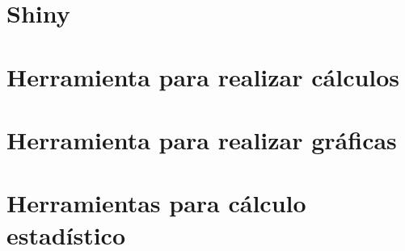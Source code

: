 \documentclass[
]{book}
\begin{document}
\section{Shiny}\label{shiny}

\section{Herramienta para realizar cálculos}\label{herramienta-para-realizar-cuxe1lculos}

\section{Herramienta para realizar gráficas}\label{herramienta-para-realizar-gruxe1ficas}

\section{Herramientas para cálculo estadístico}\label{herramientas-para-cuxe1lculo-estaduxedstico}

\label{ggb-element4}

  
\end{document}
